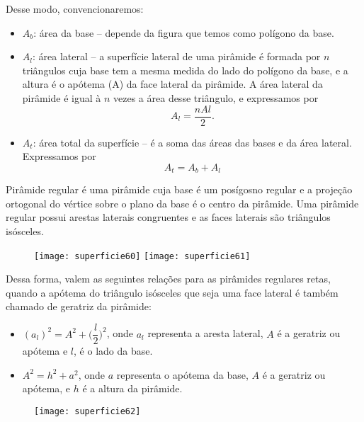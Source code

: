 Desse modo, convencionaremos:
\begin{itemize}
  \item $A_b$: área da base -- depende da figura que temos como polígono da base.
  \item $A_l$: área lateral -- a superfície lateral de uma pirâmide é formada por $n$ triângulos cuja base tem a mesma medida do lado do polígono da base, e a altura é o apótema (A) da face lateral da pirâmide. A área lateral da pirâmide é igual à $n$ vezes a área desse triângulo, e expressamos por
  \begin{equation*}
  A_l=\frac{nAl}{2}.
  \end{equation*}
  \item $A_t$: área total da superfície -- é a soma das áreas das bases e da área lateral. Expressamos por 
  \begin{equation*}
  A_t=A_b+A_l
  \end{equation*}
\end{itemize}

Pirâmide regular é uma pirâmide cuja base é um posígosno regular e a projeção ortogonal do vértice sobre o plano da base é o centro da pirâmide. Uma pirâmide regular possui arestas laterais congruentes e as faces laterais são triângulos isósceles.

\begin{figure}[H]
\centering

\texttt{[image: superficie60]}
\hspace{.5em}
\texttt{[image: superficie61]}
\end{figure}

Dessa forma, valem as seguintes relações para as pirâmides regulares retas, quando a apótema do triângulo isósceles que seja uma face lateral é também chamado de geratriz da pirâmide:
\begin{itemize}
  \item $(a_l)^2=A^2+\bigg(\dfrac{l}{2}\bigg)^2$, onde $a_l$ representa a aresta lateral, $A$ é a geratriz ou apótema e $l$, é o lado da base.
  \item $A^2=h^2+a^2$, onde $a$ representa o apótema da base, $A$ é a geratriz ou apótema, e $h$ é a altura da pirâmide.
\end{itemize}

\begin{figure}[H]
\centering

\texttt{[image: superficie62]}
\end{figure}

